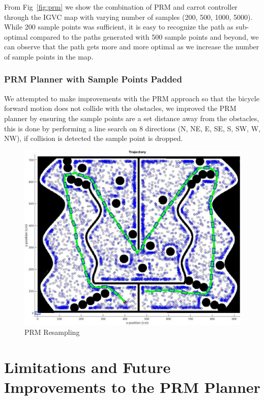 \documentclass{article}
\begin{document}
\newpage
From Fig~\ref{fig:prm} we show the combination of PRM and carrot controller through the IGVC map with varying number of samples (200, 500, 1000, 5000). While 200 sample points was sufficient, it is easy to recognize the path as sub-optimal compared to the paths generated with 500 sample points and beyond, we can observe that the path gets more and more optimal as we increase the number of sample points in the map.


\subsubsection{PRM Planner with Sample Points Padded}
\label{subsec:prm_padding}
We attempted to make improvements with the PRM approach so that the bicycle forward motion does not collide with the obstacles, we improved the PRM planner by ensuring the sample points are a set distance away from the obstacles, this is done by performing a line search on 8 directions (N, NE, E, SE, S, SW, W, NW), if collision is detected the sample point is dropped.

\begin{figure}[H]
	\centering
	\includegraphics[width=\linewidth]{images/prm_resampling.jpg}
	\caption{PRM Resampling}
	\label{fig:prm_resampling}
\end{figure}


\section{Limitations and Future Improvements to the PRM Planner}
\end{document}
